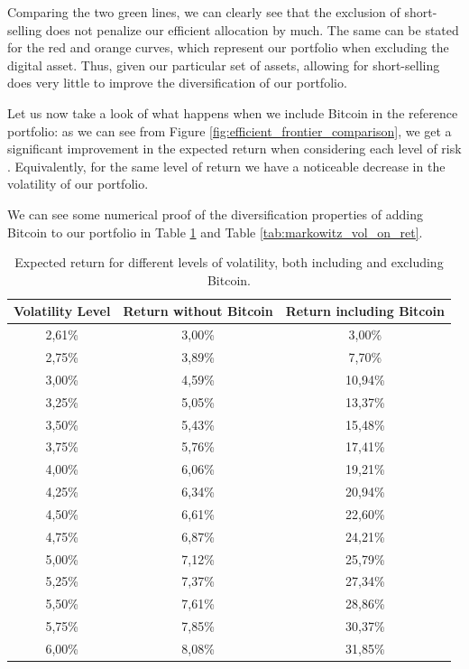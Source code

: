 Comparing the two green lines, we can clearly see that the exclusion of short-selling does not penalize our efficient allocation by much. The same can be stated for the red and orange curves, which represent our portfolio when excluding the digital asset.
Thus, given our particular set of assets, allowing for short-selling does very little to improve the diversification of our portfolio.

Let us now take a look of what happens when we include Bitcoin in the reference portfolio: as we can see from Figure \ref{fig:efficient_frontier_comparison}, we get a significant improvement in the expected return when considering each level of risk . Equivalently, for the same level of return we have a noticeable decrease in the volatility of our portfolio.


We can see some numerical proof of the diversification properties of adding Bitcoin to our portfolio in Table \ref{tab:markowitz_ret_on_vol} and Table	\ref{tab:markowitz_vol_on_ret}.

\begin{table}
\begin{tabular}{ccc}
\toprule
Volatility Level & Return without Bitcoin & Return including Bitcoin \\
\midrule
2,61\% & 3,00\% & 3,00\% \\
2,75\% & 3,89\% & 7,70\% \\
3,00\% & 4,59\% & 10,94\% \\
3,25\% & 5,05\% & 13,37\% \\
3,50\% & 5,43\% & 15,48\% \\
3,75\% & 5,76\% & 17,41\% \\
4,00\% & 6,06\% & 19,21\% \\
4,25\% & 6,34\% & 20,94\% \\
4,50\% & 6,61\% & 22,60\% \\
4,75\% & 6,87\% & 24,21\% \\
5,00\% & 7,12\% & 25,79\% \\
5,25\% & 7,37\% & 27,34\% \\
5,50\% & 7,61\% & 28,86\% \\
5,75\% & 7,85\% & 30,37\% \\
6,00\% & 8,08\% & 31,85\% \\
\bottomrule
\end{tabular}
\caption{Expected return for different levels of volatility, both including and excluding Bitcoin.}
\label{tab:markowitz_ret_on_vol}
\end{table}

